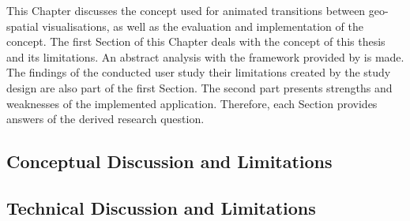 \cbstart
This Chapter discusses the concept used for animated transitions between geo-spatial visualisations, as well as the evaluation and implementation of the concept.
The first Section of this Chapter deals with the concept of this thesis and its limitations. An abstract analysis with the framework provided by \citeauthor{Munzner2014} is made. The findings of the conducted user study their limitations created by the study design are also part of the first Section. The second part presents strengths and weaknesses of the implemented application. Therefore, each Section provides answers of the derived research question.
\cbend

\subsection{Conceptual Discussion and Limitations}


\newpage
\subsection{Technical Discussion and Limitations}

